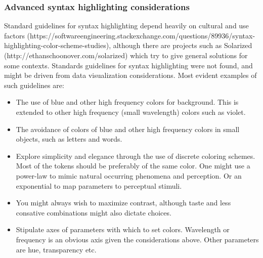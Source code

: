\documentclass{article}
\begin{document}

\subsubsection{Advanced syntax highlighting considerations}
Standard guidelines for syntax highlighting
depend heavily on cultural and use factors
(https://softwareengineering.stackexchange.com/questions/89936/syntax-highlighting-color-scheme-studies),
although there are projects such as Solarized~\cite{solazired}
(http://ethanschoonover.com/solarized)
which try to give general solutions for some contexts.
Standards guidelines for syntax highlighting were not found,
and might be driven from data visualization considerations.
Most evident examples of such guidelines are:
\begin{itemize}
  \item The use of blue and other high frequency colors for
  background.
  This is extended to other high frequency (small wavelength)
  colors such as violet.
  \item The avoidance of colors of blue and other high frequency
  colors in small objects, such as letters and words.
  \item Explore simplicity and elegance through the use of discrete
  coloring schemes. Most of the tokens should be preferably of
  the same color.
  One might use a power-law to mimic natural occurring phenomena
  and perception. Or an exponential to map parameters to perceptual
  stimuli.
  \item You might always wish to maximize contrast,
  although taste and less consative combinations might
  also dictate choices.
  \item Stipulate axes of parameters with which to set colors.
  Wavelength or frequency is an obvious axis given the considerations
  above.
  Other parameters are hue, transparency etc.


\end{itemize}
\end{document}
